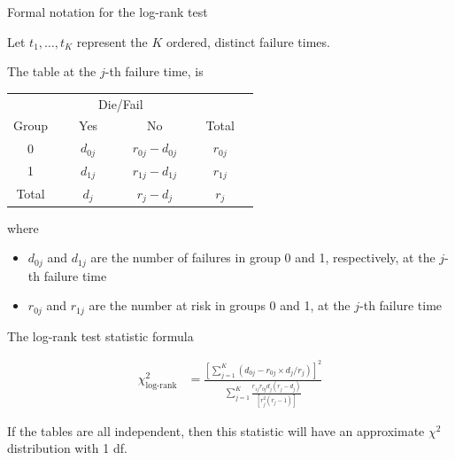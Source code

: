 \documentclass[ignorenonframetext,]{beamer}
\begin{document}
\begin{frame}{%
\protect\hypertarget{formal-notation-for-the-log-rank-test}{%
Formal notation for the log-rank test}}

Let \(t_1, \ldots ,t_K\) represent the \(K\) ordered, distinct failure
times.

The table at the \(j\)-th failure time, is

\begin{center}
\begin{tabular}{cccc}
\hline \hline
& \multicolumn{2}{c}{Die/Fail} & \\ \cline{2-3}
\multicolumn{1}{c}{Group } & ~~~Yes~~~ & ~~~No~~~ & ~~Total~~\\ \hline
0 & $d_{0j}$ & $r_{0j} - d_{0j}$ & $r_{0j}$ \\[2ex]
1 & $d_{1j}$ & $r_{1j} - d_{1j}$ & $r_{1j}$ \\[2ex]
\hline
Total &  $d_j$ & $r_j - d_j$ & $r_j$  \\ \hline \hline
\end{tabular}
\end{center}

where

\begin{itemize}
\item
  \(d_{0j}\) and \(d_{1j}\) are the number of failures in group 0 and 1,
  respectively, at the \(j\)-th failure time
\item
  \(r_{0j}\) and \(r_{1j}\) are the number at risk in groups 0 and 1, at
  the \(j\)-th failure time
\end{itemize}

\end{frame}

\begin{frame}{%
\protect\hypertarget{the-log-rank-test-statistic-formula}{%
The log-rank test statistic formula}}

\begin{align*}
\chi^2_{\text{log-rank}} &=
\frac{\left[{\sum_{j=1}^K (d_{0j} - r_{0j} \times d_j/r_j)}\right]^2}
{\sum_{j=1}^K  \frac{r_{1j} r_{0j} d_j (r_j-d_j)}{[r_j^2(r_j-1)]}}
\end{align*}

If the tables are all independent, then this statistic will have an
approximate \(\chi^2\) distribution with 1 df.

\end{frame}
\end{document}
